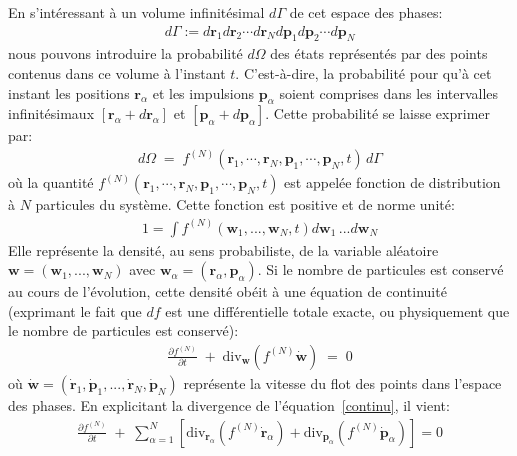 En s'intéressant à un volume infinitésimal $d\Gamma$ de cet espace
des phases:
\begin{align*}
	d\Gamma:=d\mathbf{r}_{1}d\mathbf{r}_{2}\cdots d\mathbf{r}_{N}d\mathbf{p}_{1}d\mathbf{p}_{2}\cdots d\mathbf{p}_{N}
\end{align*}
nous pouvons introduire la probabilité $d\Omega$ des états représentés par des points contenus dans ce volume à l'instant $t$. C'est-à-dire, la probabilité
pour qu'à cet instant les positions $\mathbf{r}_{\alpha}$ et les {impulsion}s $\mathbf{p}_{\alpha}$ soient comprises dans les intervalles
infinitésimaux $[\mathbf{r}_{\alpha }+d\mathbf{r}_{\alpha}]$ et $[\mathbf{p}_{\alpha}+d\mathbf{p}_{\alpha}]$. Cette probabilité se laisse exprimer
par:
\begin{align*}
	d\Omega\;=\;f^{(N)}(\mathbf{r}_{1},\cdots,\mathbf{r}_{N},\mathbf{p}_{1},\cdots,\mathbf{p}_{N},t)\,d\Gamma
\end{align*}
où la quantité $f^{(N)}(\mathbf{r}_{1},\cdots,\mathbf{r} _{N},\mathbf{p}_{1},\cdots,\mathbf{p}_{N},t)$ est appelée fonction de distribution à $N$
particules du système. Cette fonction est positive et de norme unité:
\begin{align*}
	1=\int f^{\left(N\right)}\left(\mathbf{w}_{1},...,\mathbf{w}_{N},t\right)d\mathbf{w}_{1}\,...d\mathbf{w}_{N}
\end{align*}
Elle représente la densité, au sens probabiliste, de la variable aléatoire $\mathbf{w}=(\mathbf{w}_{1},...,\mathbf{w}_{N})$ avec
$\mathbf{w}_{\alpha}=\left(  \mathbf{r}_{\alpha},\mathbf{p}_{\alpha}\right) $. Si le nombre de particules est conservé au cours de l'évolution, cette
densité obéit à une équation de continuité (exprimant le fait que $df$ est une différentielle totale exacte, ou physiquement que le nombre de
particules est conservé):
\begin{align}
	\frac{\partial f^{(N)}}{\partial t}\;+\;\mathrm{div}_{\mathbf{w}}(f^{(N)}\mathbf{\dot{w}})\;=\;0\label{continu}%
\end{align}
où $\mathbf{\dot{w}}=(\mathbf{\dot{r}}_{1},\mathbf{\dot{p}}_{1} ,...,\mathbf{\dot{r}}_{N},\mathbf{\dot{p}}_{N})$ représente la vitesse du flot des
points dans l'espace des phases. En explicitant la divergence de l'équation~\ref{continu}, il vient:
\begin{align*}
	\frac{\partial f^{(N)}}{\partial t}\;+\;\sum_{\alpha=1}^{N}\left[\mathrm{div}_{\mathbf{r}_{\alpha}}\left(  f^{(N)}\mathbf{\dot{r}}_{\alpha
	}\right)  +\mathrm{div}_{\mathbf{p}_{\alpha}}\left(  f^{(N)}\mathbf{\dot{p}}_{\alpha}\right)  \right]=0
\end{align*}
